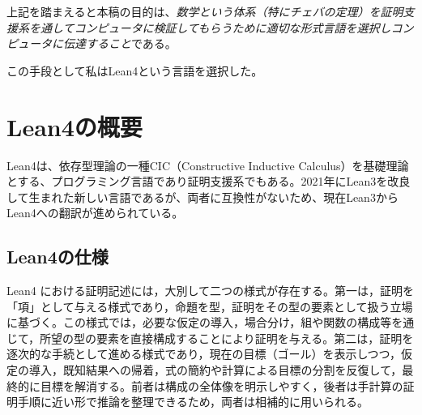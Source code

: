 \documentclass[a4paper,12pt]{bxjsbook}
\newlength{\customindent}
\newenvironment{body}{
  \par
  \begingroup
  \setlength{\leftskip}{\customindent}
  \setlength{\rightskip}{0pt}
  \setlength{\parindent}{1em}
  \setlength{\displayindent}{\customindent}
  \setlength{\displaywidth}{\dimexpr\linewidth-\customindent\relax}
}{
  \par
  \endgroup
}
\theoremstyle{theorem}
\begin{document}

    \begin{body}
        \indent 上記を踏まえると本稿の目的は、\emph{数学という体系（特にチェバの定理）を証明支援系を通してコンピュータに検証してもらうために適切な形式言語を選択しコンピュータに伝達すること}である。

        \indent この手段として私はLean4という言語を選択した。
    \end{body}

    \section{Lean4の概要}
    \begin{body}
        \indent Lean4は、依存型理論の一種CIC（Constructive Inductive Calculus）を基礎理論とする、プログラミング言語であり証明支援系でもある。2021年にLean3を改良して生まれた新しい言語であるが、両者に互換性がないため、現在Lean3からLean4への翻訳が進められている。

    \end{body}

    \subsection{Lean4の仕様}
    \begin{body}
        Lean4 における証明記述には，大別して二つの様式が存在する。第一は，証明を「項」として与える様式であり，命題を型，証明をその型の要素として扱う立場に基づく。この様式では，必要な仮定の導入，場合分け，組や関数の構成等を通じて，所望の型の要素を直接構成することにより証明を与える。第二は，証明を逐次的な手続として進める様式であり，現在の目標（ゴール）を表示しつつ，仮定の導入，既知結果への帰着，式の簡約や計算による目標の分割を反復して，最終的に目標を解消する。前者は構成の全体像を明示しやすく，後者は手計算の証明手順に近い形で推論を整理できるため，両者は相補的に用いられる。
    \end{body}
\end{document}
